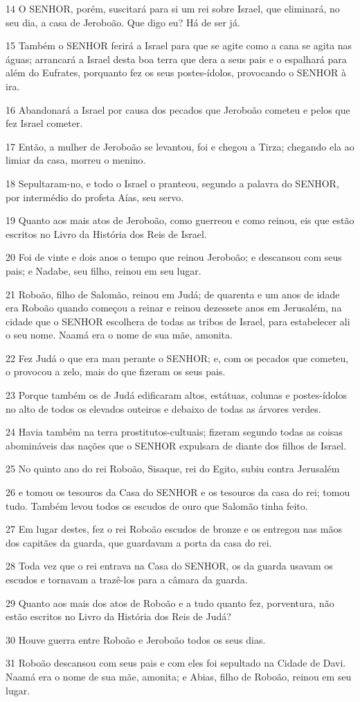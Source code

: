 \par 14 O SENHOR, porém, suscitará para si um rei sobre Israel, que eliminará, no seu dia, a casa de Jeroboão. Que digo eu? Há de ser já.
\par 15 Também o SENHOR ferirá a Israel para que se agite como a cana se agita nas águas; arrancará a Israel desta boa terra que dera a seus pais e o espalhará para além do Eufrates, porquanto fez os seus postes-ídolos, provocando o SENHOR à ira.
\par 16 Abandonará a Israel por causa dos pecados que Jeroboão cometeu e pelos que fez Israel cometer.
\par 17 Então, a mulher de Jeroboão se levantou, foi e chegou a Tirza; chegando ela ao limiar da casa, morreu o menino.
\par 18 Sepultaram-no, e todo o Israel o pranteou, segundo a palavra do SENHOR, por intermédio do profeta Aías, seu servo.
\par 19 Quanto aos mais atos de Jeroboão, como guerreou e como reinou, eis que estão escritos no Livro da História dos Reis de Israel.
\par 20 Foi de vinte e dois anos o tempo que reinou Jeroboão; e descansou com seus pais; e Nadabe, seu filho, reinou em seu lugar.
\par 21 Roboão, filho de Salomão, reinou em Judá; de quarenta e um anos de idade era Roboão quando começou a reinar e reinou dezessete anos em Jerusalém, na cidade que o SENHOR escolhera de todas as tribos de Israel, para estabelecer ali o seu nome. Naamá era o nome de sua mãe, amonita.
\par 22 Fez Judá o que era mau perante o SENHOR; e, com os pecados que cometeu, o provocou a zelo, mais do que fizeram os seus pais.
\par 23 Porque também os de Judá edificaram altos, estátuas, colunas e postes-ídolos no alto de todos os elevados outeiros e debaixo de todas as árvores verdes.
\par 24 Havia também na terra prostitutos-cultuais; fizeram segundo todas as coisas abomináveis das nações que o SENHOR expulsara de diante dos filhos de Israel.
\par 25 No quinto ano do rei Roboão, Sisaque, rei do Egito, subiu contra Jerusalém
\par 26 e tomou os tesouros da Casa do SENHOR e os tesouros da casa do rei; tomou tudo. Também levou todos os escudos de ouro que Salomão tinha feito.
\par 27 Em lugar destes, fez o rei Roboão escudos de bronze e os entregou nas mãos dos capitães da guarda, que guardavam a porta da casa do rei.
\par 28 Toda vez que o rei entrava na Casa do SENHOR, os da guarda usavam os escudos e tornavam a trazê-los para a câmara da guarda.
\par 29 Quanto aos mais dos atos de Roboão e a tudo quanto fez, porventura, não estão escritos no Livro da História dos Reis de Judá?
\par 30 Houve guerra entre Roboão e Jeroboão todos os seus dias.
\par 31 Roboão descansou com seus pais e com eles foi sepultado na Cidade de Davi. Naamá era o nome de sua mãe, amonita; e Abias, filho de Roboão, reinou em seu lugar.

